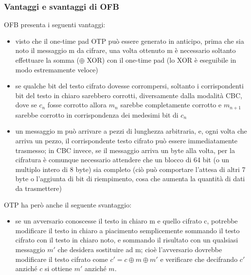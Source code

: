 \subsubsection{Vantaggi e svantaggi di OFB}
OFB presenta i seguenti vantaggi:
\begin{itemize}
\item visto che il one-time pad OTP può essere generato in anticipo, prima che sia noto il messaggio m da cifrare, una volta ottenuto m è necessario soltanto effettuare la somma ($\oplus$ XOR) con il one-time pad (lo XOR è eseguibile in modo estremamente veloce)
\item se qualche bit del testo cifrato dovesse corrompersi, soltanto i corrispondenti bit del testo in chiaro sarebbero corrotti, diversamente dalla modalità CBC, dove se $c_{n}$ fosse corrotto allora $m_{n}$ sarebbe completamente corrotto e $m_{n+1}$ sarebbe corrotto in corrispondenza dei medesimi bit di $c_{n}$
\item un messaggio m può arrivare a pezzi di lunghezza arbitraria, e, ogni volta che arriva un pezzo, il corrispondente testo cifrato può essere immediatamente trasmesso; in CBC invece, se il messaggio arriva un byte alla volta, per la cifratura è comunque necessario attendere che un blocco di 64 bit (o un multiplo intero di 8 byte) sia completo (ciò può comportare l'attesa di altri 7 byte o l'aggiunta di bit di riempimento, cosa che aumenta la quantità di dati da trasmettere)
\end{itemize}
OTP ha però anche il seguente svantaggio:
\begin{itemize}
\item se un avversario conoscesse il testo in chiaro m e quello cifrato c, potrebbe modificare il testo in
chiaro a piacimento semplicemente sommando il testo cifrato con il testo in chiaro noto, e sommando il risultato con un qualsiasi messaggio $m'$ che desidera sostituire ad m; cioè l'avversario dovrebbe modificare il testo cifrato come $c' = c \oplus m \oplus m'$ e verificare che decifrando $c'$ anziché $c$ si ottiene $m'$ anziché $m$.
\end{itemize}


